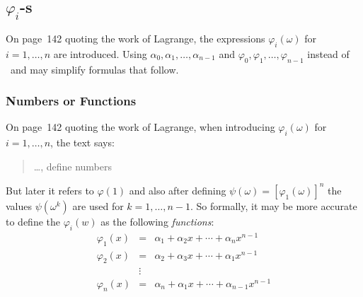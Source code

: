\iffalse %
 \subsection{Transposition Notation}
 In page~141, the text refers to transpositions (23) and (132).
 The should be notated in ``math mode'' as \((23)\) and \((132)\).
 Without math mode, the symbol "(23)" looks like a formula reference.
\fi


\subsection{\ensuremath{\varphi_i}-s}

On page~142 quoting the work of Lagrange,
the expressions \(\varphi_i(\omega)\) for \(i=1,\ldots,n\)
are introduced.
Using
  \(\alpha_0,\alpha_1,\ldots,\alpha_{n-1}\)
and
  \(\varphi_0,\varphi_1,\ldots,\varphi_{n-1}\)
instead of \seqalphn\ and \seqn{\varphi}
may simplify formulas that follow.


\subsubsection{Numbers or Functions}

On page~142 quoting the work of Lagrange,
when introducing \(\varphi_i(\omega)\) for \(i=1,\ldots,n\),
the text says:
\begin{quotation}
\ldots, define numbers
\end{quotation}
But later it refers to \(\varphi(1)\) and also after
defining \(\psi(\omega) = [\varphi_1(\omega)]^n\)
the values \(\psi(\omega^k)\) are used for \(k=1,\ldots,n-1\).
So formally, it may be more accurate to define the \(\varphi_i(w)\)
as the following \emph{functions}:
\begin{eqnarray*}
\varphi_1(x) &=& \alpha_1 + \alpha_2x + \cdots + \alpha_nx^{n-1}\\
\varphi_2(x) &=& \alpha_2 + \alpha_3x + \cdots + \alpha_1x^{n-1}\\
           &\vdots& \\
\varphi_n(x) &=& \alpha_n + \alpha_1x + \cdots + \alpha_{n-1}x^{n-1}
\end{eqnarray*}

